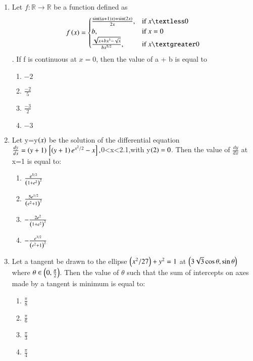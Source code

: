 \documentclass[journal,12pt,twocolumn]{IEEEtran}
\theoremstyle{remark}
\begin{document}
\begin{enumerate}[start=16]
\begin{enumerate}
\end{enumerate}
\item Let $f : \mathbb{R} \to \mathbb{R}$ be a function defined as 
\begin{equation}
	f\brak{x} = 
\begin{cases} 
\frac{\sin\brak{\brak{a+1}x} + \sin\brak{2x}}{2x}, & $if $  x \textless 0 \\ 
b, & $if $ x = 0 \\ 
\frac{\sqrt{x + bx^{3} - \sqrt{x}}}{bx^{5/2}}, & $if $ x \textgreater 0 
\end{cases}
\end{equation}
. If f is continuous at $ x = 0$, then the value of a + b is equal to
\hfill{}
		\begin{enumerate}
    \item $-2$
    \item $\frac{-2}{5}$
    \item $\frac{-3}{2}$
    \item $-3$
\end{enumerate}
\item Let y=y$\left(x\right)$ be the solution of the differential equation $\frac{dy}{dx}=\left(y+1\right){}\left[\left(y+1\right)e^{x^2/2}-x\right] ,$0\textless x\textless 2.1,with y$\left(2\right)=0$. Then the value of $\frac{dy}{dx}$ at x=1 is equal to:
\hfill{}
	\begin{enumerate}
\item $\frac{e^{5/2}}{\left(1 + e^{2}\right)^{2}} $
\item $ \frac{5 e^{1/2}}{\left(e^{2} + 1\right)^{2}} $
\item $ -\frac{2 e^{2}}{\left(1 + e^{2}\right)^{2}} $
\item $ -\frac{e^{3/2}}{\left(e^{2} + 1\right)^{2}} $
\end{enumerate}
\item Let a tangent be drawn to the ellipse $\left(x^2/27\right)+y^2=1$ at $\left(3\sqrt{3} \cos \theta, \sin \theta\right) \quad $where $ \theta \in \left(0, \frac{\pi}{2}\right)$.  Then the value of $\theta$ such that the sum of intercepts on axes made by a tangent is minimum is equal to:
\hfill{}
	\begin{enumerate}
    \item $\frac{\pi}{8}$
    \item $\frac{\pi}{6}$
    \item $\frac{\pi}{3}$
    \item $\frac{\pi}{4}$
\end{enumerate}

\end{enumerate}
\end{document}
